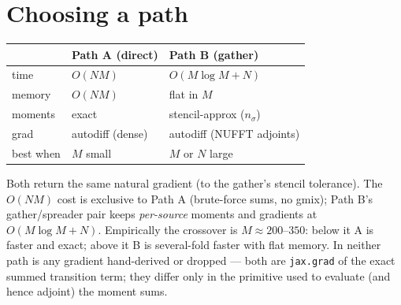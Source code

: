 \documentclass[11pt]{article}
\newcommand{\code}[1]{\texttt{\small #1}}
\begin{document}
\section{Choosing a path}
\begin{center}
\renewcommand{\arraystretch}{1.25}
\begin{tabular}{@{}lll@{}}
\toprule
 & Path A (direct) & Path B (gather) \\
\midrule
time    & $O(NM)$          & $O(M\log M + N)$ \\
memory  & $O(NM)$          & flat in $M$ \\
moments & exact            & stencil-approx ($n_\sigma$) \\
grad    & autodiff (dense) & autodiff (NUFFT adjoints) \\
best when & $M$ small       & $M$ or $N$ large \\
\bottomrule
\end{tabular}
\end{center}
\noindent
Both return the same natural gradient (to the gather's stencil tolerance).
The $O(NM)$ cost is exclusive to Path A (brute-force sums, no gmix); Path B's
gather/spreader pair keeps \emph{per-source} moments and gradients at
$O(M\log M + N)$.
Empirically the crossover is $M\!\approx\!200$--$350$: below it A is faster
and exact; above it B is several-fold faster with flat memory. In neither
path is any gradient hand-derived or dropped --- both are \code{jax.grad}
of the exact summed transition term; they differ only in the primitive
used to evaluate (and hence adjoint) the moment sums.
\end{document}
